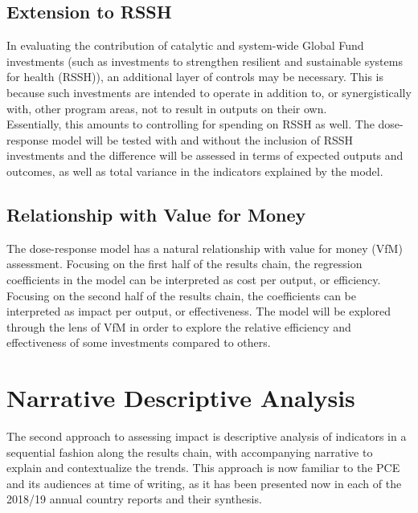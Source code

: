 \documentclass[twocolumn]{bmcart}%
\begin{document}
\subsection{Extension to RSSH}
In evaluating the contribution of catalytic and system-wide Global Fund investments (such as investments to strengthen resilient and sustainable systems for health (RSSH)), an additional layer of controls may be necessary. This is because such investments are intended to operate in addition to, or synergistically with, other program areas, not to result in outputs on their own. \\

Essentially, this amounts to controlling for spending on RSSH as well. The dose-response model will be tested with and without the inclusion of RSSH investments and the difference will be assessed in terms of expected outputs and outcomes, as well as total variance in the indicators explained by the model.

\subsection{Relationship with Value for Money} \label{vfm}
The dose-response model has a natural relationship with value for money (VfM) assessment. Focusing on the first half of the results chain, the regression coefficients in the model can be interpreted as cost per output, or efficiency. Focusing on the second half of the results chain, the coefficients can be interpreted as impact per output, or effectiveness. The model will be explored through the lens of VfM in order to explore the relative efficiency and effectiveness of some investments compared to others. \\

\section{Narrative Descriptive Analysis}
The second approach to assessing impact is descriptive analysis of indicators in a sequential fashion along the results chain, with accompanying narrative to explain and contextualize the trends. This approach is now familiar to the PCE and its audiences at time of writing, as it has been presented now in each of the 2018/19 annual country reports and their synthesis. \\
\end{document}
